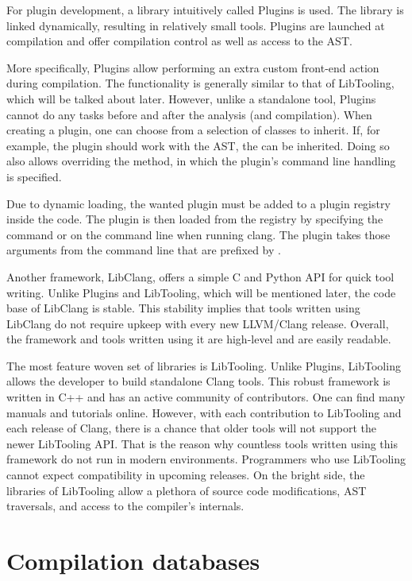 For plugin development, a library intuitively called Plugins is used.
The library is linked dynamically, resulting in relatively small tools.
Plugins are launched at compilation and offer compilation control as well 
as access to the AST.

More specifically, Plugins allow performing an extra custom front-end action 
during compilation.
The functionality is generally similar to that of LibTooling, which will be 
talked about later.
However, unlike a standalone tool, Plugins cannot do any tasks before and after 
the analysis (and compilation).
When creating a plugin, one can choose from a selection of 
 classes to inherit.
If, for example, the plugin should work with the AST, 
the  can be inherited.
Doing so also allows overriding the  method, in which 
the plugin's command line handling is specified.

Due to dynamic loading, the wanted plugin must be added to a plugin registry 
inside the code.
The plugin is then loaded from the registry by specifying the  
command or  on the command line when running clang.
The plugin takes those arguments from the command line that are prefixed 
by .

Another framework, LibClang, offers a simple C and Python API for quick 
tool writing. 
Unlike Plugins and LibTooling, which will be mentioned later, the code 
base of LibClang is stable. 
This stability implies that tools written using LibClang do not require
upkeep with every new LLVM/Clang release. 
Overall, the framework and tools written using it are high-level and 
are easily readable.

The most feature woven set of libraries is LibTooling. 
Unlike Plugins, LibTooling allows the developer to build standalone 
Clang tools. 
This robust framework is written in C++ and has an active 
community of contributors. 
One can find many manuals and tutorials online. 
However, with each contribution to LibTooling and each release of Clang, 
there is a chance that older tools will not support the newer LibTooling 
API. 
That is the reason why countless tools written using this framework do not
run in modern environments. 
Programmers who use LibTooling cannot expect compatibility in upcoming 
releases. 
On the bright side, the libraries of LibTooling allow a plethora of source
code modifications, AST traversals, and access to the compiler's internals.

\section{Compilation databases}

